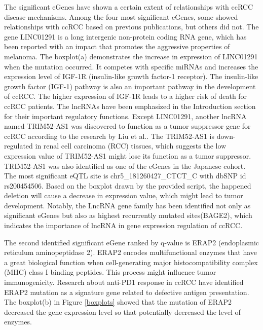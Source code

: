 The significant eGenes have shown a certain extent of relationships with ccRCC disease mechanisms. Among the four most significant eGenes, some showed relationships with ccRCC based on previous publications, but others did not. The gene LINC01291 is a long intergenic non-protein coding RNA gene, which has been reported with an impact that promotes the aggressive properties of melanoma. The boxplot(a) demonstrates the increase in expression of LINC01291 when the mutation occurred. It competes with specific miRNAs and increases the expression level of IGF-1R (insulin-like growth factor-1 receptor)\cite{wu_long_2021}. The insulin-like growth factor (IGF-1) pathway is also an important pathway in the development of ccRCC. The higher expression of IGF-1R leads to a higher risk of death for ccRCC patients\cite{tracz_insulin-like_2016}. The lncRNAs have been emphasized in the Introduction section for their important regulatory functions. Except LINC01291, another lncRNA named TRIM52-AS1 was discovered to function as a tumor suppressor gene for ccRCC according to the research by Liu et al.\cite{liu_downregulation_2016}. The TRIM52-AS1 is down-regulated in renal cell carcinoma (RCC) tissues, which suggests the low expression value of TRIM52-AS1 might lose its function as a tumor suppressor. TRIM52-AS1 was also identified as one of the eGenes in the Japanese cohort. The most significant eQTL site is chr5\_181260427\_CTCT\_C with dbSNP id rs200454506. Based on the boxplot drawn by the provided script, the happened deletion will cause a decrease in expression value, which might lead to tumor development. Notably, the LncRNA gene family has been identified not only as significant eGenes but also as highest recurrently mutated sites(BAGE2), which indicates the importance of lncRNA in gene expression regulation of ccRCC.

The second identified significant eGene ranked by q-value is ERAP2 (endoplasmic reticulum aminopeptidase 2). ERAP2 encodes multifunctional enzymes that have a great biological function when cell-generating major histocompatibility complex (MHC) class I binding peptides\cite{compagnone_regulation_2019}. This process might influence tumor immunogenicity. Research about anti-PD1 response in ccRCC \cite{au_determinants_2021}have identified ERAP2 mutation as a signature gene related to defective antigen presentation. The boxplot(b) in Figure \ref{boxplots} showed that the mutation of ERAP2 decreased the gene expression level so that potentially decreased the level of enzymes. 

